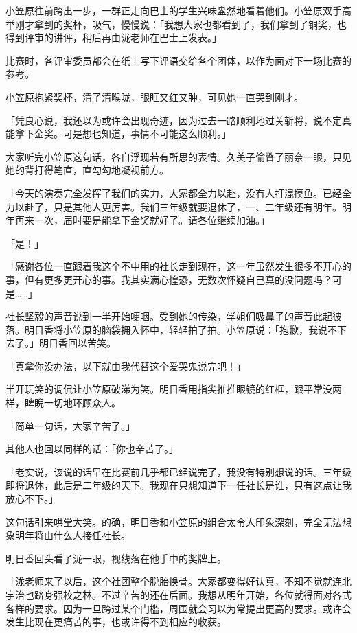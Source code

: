 \documentclass[UTF8]{ctexart}
\begin{document}
    小笠原往前跨出一步，一群正走向巴士的学生兴味盎然地看着他们。小笠原双手高举刚才拿到的奖杯，吸气，慢慢说：「我想大家也都看到了，我们拿到了铜奖，也得到评审的讲评，稍后再由泷老师在巴士上发表。」 

    比赛时，各评审委员都会在纸上写下评语交给各个团体，以作为面对下一场比赛的参考。 

    小笠原抱紧奖杯，清了清喉咙，眼眶又红又肿，可见她一直哭到刚才。 

    「凭良心说，我还以为或许会出现奇迹，因为过去一路顺利地过关斩将，说不定真能拿下金奖。可是想也知道，事情不可能这么顺利。」 

    大家听完小笠原这句话，各自浮现若有所思的表情。久美子偷瞥了丽奈一眼，只见她的背打得笔直，直勾勾地凝视前方。 

    「今天的演奏完全发挥了我们的实力，大家都全力以赴，没有人打混摸鱼。已经全力以赴了，只是其他人更厉害。我们三年级就要退休了，一、二年级还有明年。明年再来一次，届时要是能拿下金奖就好了。请各位继续加油。」 

    「是！」 

    「感谢各位一直跟着我这个不中用的社长走到现在，这一年虽然发生很多不开心的事，但有更多更开心的事。我其实满心惶恐，无数次怀疑自己真的没问题吗？可是……」 

    社长坚毅的声音说到一半开始哽咽。受到她的传染，学姐们吸鼻子的声音此起彼落。明日香将小笠原的脑袋拥入怀中，轻轻拍了拍。小笠原说：「抱歉，我说不下去了。」明日香回以苦笑。 

    「真拿你没办法，以下就由我代替这个爱哭鬼说完吧！」 

    半开玩笑的调侃让小笠原破涕为笑。明日香用指尖推推眼镜的红框，跟平常没两样，睥睨一切地环顾众人。 

    「简单一句话，大家辛苦了。」 

    其他人也回以同样的话：「你也辛苦了。」 

    「老实说，该说的话早在比赛前几乎都已经说完了，我没有特别想说的话。三年级即将退休，此后是二年级的天下。我现在只想知道下一任社长是谁，只有这点让我放心不下。」 

    这句话引来哄堂大笑。的确，明日香和小笠原的组合太令人印象深刻，完全无法想象明年将由什么人接任社长。 

    明日香回头看了泷一眼，视线落在他手中的奖牌上。 

    「泷老师来了以后，这个社团整个脱胎换骨。大家都变得好认真，不知不觉就连北宇治也跻身强校之林。不过辛苦的还在后面。我想从明年开始，各位就得面对各式各样的要求。因为一旦跨过某个门槛，周围就会习以为常提出更高的要求。或许会发生比现在更痛苦的事，也或许得不到相应的收获。 
\end{document}

